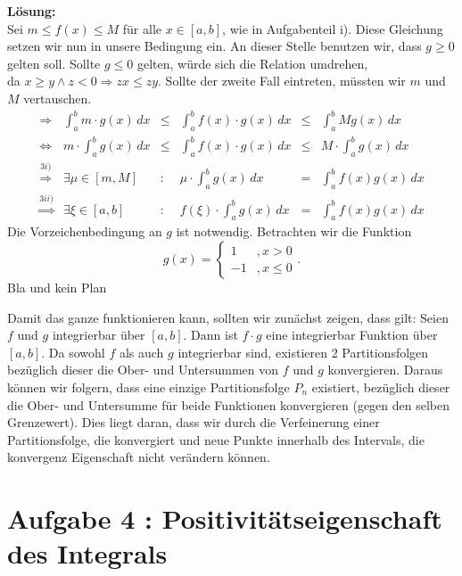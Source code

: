 \documentclass[11pt,a4paper,ngerman]{article}
\begin{document}
\begin{enumerate}[i)]
\textbf{Lösung:}\\
Sei $m \leq f(x) \leq M$ für alle $x \in [a,b]$, wie in Aufgabenteil i). Diese Gleichung setzen wir nun in unsere Bedingung ein. An dieser Stelle benutzen wir, dass $g\geq0$ gelten soll. Sollte $g\leq 0$ gelten, würde sich die Relation umdrehen, \\da $x\geq y \land z<0 \Rightarrow zx \leq zy$. Sollte der zweite Fall eintreten, müssten wir $m$ und $M$ vertauschen.\\
$$
\begin{array}{crcccl}
\Rightarrow& \int_a^b m\cdot g(x) \, dx& \leq & \int_a^b f(x) \cdot g(x) \, dx & \leq & \int_a^b M g(x) \, dx\\
\Leftrightarrow & m \cdot \int_a^b g(x) \, dx & \leq & \int_a^b f(x) \cdot g(x) \, dx & \leq & M \cdot \int_a^b g(x) \, dx\\
\stackrel{3i)}{\Rightarrow} & \exists \mu \in [m,M]&:& \mu \cdot \int_a^b g(x) \, dx & = & \int_a^b f(x)g(x) \, dx \\
\stackrel{3ii)}{\Rightarrow} & \exists \xi \in [a,b] &:& f(\xi) \cdot \int_a^b g(x) \, dx &=& \int_a^b f(x)g(x) \, dx
\end{array}
$$
Die Vorzeichenbedingung an $g$ ist notwendig. Betrachten wir die Funktion
$$
g(x) = \left\{
\begin{array}{lr}
1&,x>0\\
-1&,x\leq0
\end{array}
\right. .
$$
Bla und kein Plan

Damit das ganze funktionieren kann, sollten wir zunächst zeigen, dass gilt:
Seien $f$ und $g$ integrierbar über $[a,b]$.  Dann ist $f\cdot g$ eine integrierbar Funktion über $[a,b]$. Da sowohl $f$ als auch $g$ integrierbar sind, existieren 2 Partitionsfolgen bezüglich dieser die Ober- und Untersummen von $f$ und $g$ konvergieren. Daraus können wir folgern, dass eine einzige Partitionsfolge $P_n$ existiert, bezüglich dieser die Ober- und Untersumme für beide Funktionen konvergieren (gegen den selben Grenzewert). Dies liegt daran, dass wir durch die Verfeinerung einer Partitionsfolge, die konvergiert und neue Punkte innerhalb des Intervals, die konvergenz Eigenschaft nicht verändern können.


\end{enumerate}


\section*{Aufgabe 4 : \mdseries Positivitätseigenschaft des Integrals}
\end{document}
